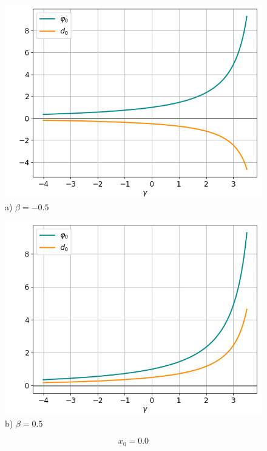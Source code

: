 \documentclass[fullscreen=true, unicode, bookmarks=false]{beamer}
\begin{document}
\begin{frame}
\begin{figure} 
\begin{minipage}[h]{0.49\linewidth}
\begin{center}
\includegraphics[scale=0.34]{divergent_phi0d0_x0=0,0,beta=-0,5.png} \\ {\scriptsize a) $ \beta = -0.5 $}
\end{center}
\end{minipage} 
\hfill
\begin{minipage}[h]{0.49\linewidth}
\begin{center}
\includegraphics[scale=0.34]{divergent_phi0d0_x0=0,0,beta=0,5.png}  \\ {\scriptsize b) $ \beta = 0.5 $}
\end{center}
\end{minipage} 
\end{figure}

$$ x_0 = 0.0 $$

\end{frame}
\end{document}
